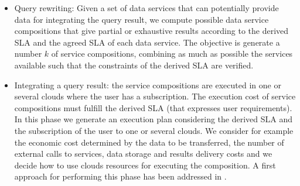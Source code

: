 \begin{itemize}
\item   Query rewriting: Given a set of data services that can potentially provide data for integrating the query result, we compute possible data service compositions that give partial or exhaustive  results according to the derived SLA and the agreed SLA of each data service. The objective is   generate a number $k$ of service compositions, combining as much as possible the services available such that the constraints of the derived SLA are verified. 


\item  Integrating a query result: the service compositions are executed in one or several clouds where the user has a subscription. The execution cost of  service compositions must fulfill the derived SLA (that expresses user requirements). In this phase we generate an execution plan  considering the derived SLA and the subscription of the user to one or several clouds. We consider for example the economic cost determined by the data to be transferred, the number of external calls to services, data storage and results delivery costs and we decide how to use clouds resources for executing the composition. A first approach for performing this phase has been addressed  in  \cite{Lopez14}.
\end{itemize}



